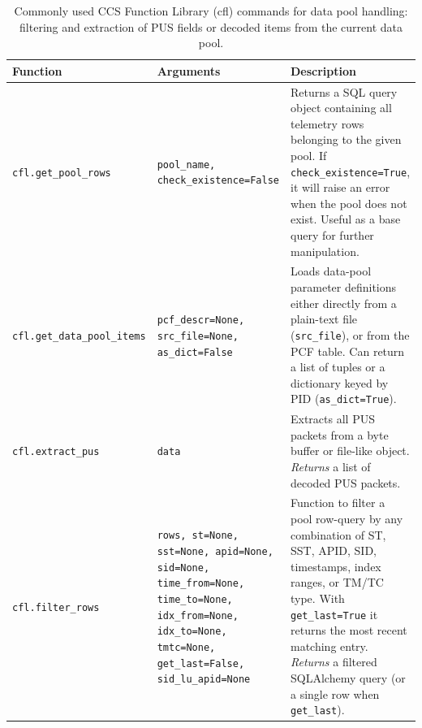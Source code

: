 
\begin{table}[h!]
\centering
\renewcommand{\arraystretch}{1.3}
\setlength{\tabcolsep}{8pt}
\begin{tabular}{p{4cm} p{5cm} p{6cm}}
\hline
\textbf{Function} & \textbf{Arguments} & \textbf{Description} \\ 
\hline

\texttt{cfl.get\_pool\_rows} & \texttt{pool\_name, check\_existence=False} &
Returns a SQL query object containing all telemetry rows belonging to the given pool.  
If \texttt{check\_existence=True}, it will raise an error when the pool does not exist.  
Useful as a base query for further manipulation. \\


\texttt{cfl.get\_data\_pool\_items} & \texttt{pcf\_descr=None, src\_file=None, as\_dict=False} &
Loads data-pool parameter definitions either directly from a plain-text file (\texttt{src\_file}), or from the PCF table.  
Can return a list of tuples or a dictionary keyed by PID (\texttt{as\_dict=True}). \\

\texttt{cfl.extract\_pus} & \texttt{data} & 
Extracts all PUS packets from a byte buffer or file-like object.  
\emph{Returns} a list of decoded PUS packets.  \\

\texttt{cfl.filter\_rows} & \texttt{rows, st=None, sst=None, apid=None, sid=None, time\_from=None, time\_to=None, idx\_from=None, idx\_to=None, tmtc=None, get\_last=False, sid\_lu\_apid=None} &
Function to filter a pool row-query by any combination of  
ST, SST, APID, SID, timestamps, index ranges, or TM/TC type.  
With \texttt{get\_last=True} it returns the most recent matching entry.  
\emph{Returns} a filtered SQLAlchemy query (or a single row when \texttt{get\_last}). \\

\hline
\end{tabular}
\caption{Commonly used CCS Function Library (cfl) commands for data pool handling: filtering and extraction of PUS fields or decoded items from the current data pool.}
\end{table}





